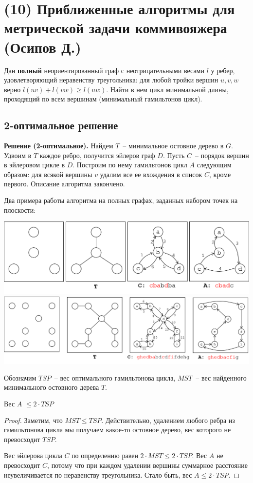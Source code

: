 \section{(10) Приближенные алгоритмы для метрической задачи коммивояжера (Осипов Д.)}

\begin{problem*}
	Дан \textbf{полный} неориентированный граф с неотрицательными весами $l$ у ребер, удовлетворяющий неравенству треугольника: для любой тройки вершин $u, v, w$ верно $l(uv) + l(vw) \geq l(uw)$. Найти в нем цикл минимальной длины, проходящий по всем вершинам (минимальный гамильтонов цикл).
\end{problem*}

\subsection{2-оптимальное решение}
\textbf{Решение (2-оптимальное).} Найдем $T$~-- минимальное остовное дерево в $G$. Удвоим в $T$ каждое ребро, получится эйлеров граф $D$. Пусть $C$~-- порядок вершин в эйлеровом цикле в $D$. Построим по нему гамильтонов цикл $A$ следующим образом: для всякой вершины $v$ удалим все ее вхождения в список $C$, кроме первого. Описание алгоритма закончено.

Два примера работы алгоритма на полных графах, заданных набором точек на плоскости:

\includegraphics[width=\textwidth]{figures/ex_shorthamil.png} \\
\includegraphics[width=\textwidth]{figures/ex_longhamil.png}

Обозначим $TSP$~-- вес оптимального гамильтонова цикла, $MST$~-- вес найденного минимального остовного дерева $T$.
\begin{theorem*} Вес $A$ $\leq 2 \cdot TSP$ \end{theorem*}
\begin{proof}
Заметим, что $MST \leq TSP$. Действительно, удалением любого ребра из гамильтонова цикла мы получаем какое-то остовное дерево, вес которого не превосходит $TSP$.

Вес эйлерова цикла $C$ по определению равен $2\cdot MST \leq 2\cdot TSP$. Вес $A$ не превосходит $C$, потому что при каждом удалении вершины суммарное расстояние неувеличивается по неравенству треугольника. Стало быть, вес $A \leq 2 \cdot TSP$.
\end{proof}

